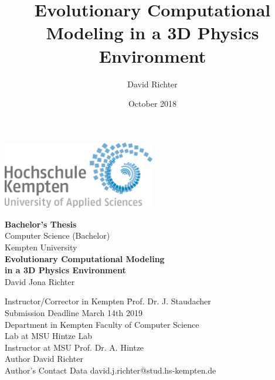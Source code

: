 \documentclass[12pt,oneside,listof=totoc,paper=a4,headings=small]{scrbook}
\title{Evolutionary Computational Modeling in a 3D Physics Environment}
\author{David Richter}
\date{October 2018}
\begin{document}
\frontmatter


\thispagestyle{empty}
\vspace*{-20mm}

\begin{center}
\includegraphics[width=0.5\textwidth]{images/2000px-Logo_Hochschule_Kempten.png}
\end{center}

\vspace*{1cm}
\begin{center}
{\Large \textbf{Bachelor's Thesis}}\\
\vspace*{0.5cm}
{\large Computer Science (Bachelor)\\[1mm]}
{\large Kempten University\\[1mm]}
\vspace{0.5cm}
{\Large \bfseries Evolutionary Computational Modeling\\ in a 3D Physics Environment\\}
\vspace{1cm}
{\large David Jona Richter}\\[40mm]
\end{center}
\vfill

\begin{center}
\parbox{120mm}{
\begin{tabbing}
Instructor/Corrector in Kempten \hspace{1.45cm} \= Prof. Dr. J. Staudacher\\
Submission Deadline                        \> March 14th 2019\\
Department in Kempten                  \> Faculty of Computer Science\\
Lab at MSU \> Hintze Lab\\
Instructor at MSU                   \>Prof. Dr. A. Hintze\\
Author                              \> David Richter \\

Author's Contact Data               \> david.j.richter@stud.hs-kempten.de
\end{tabbing}
}
\end{center}
\end{document}
